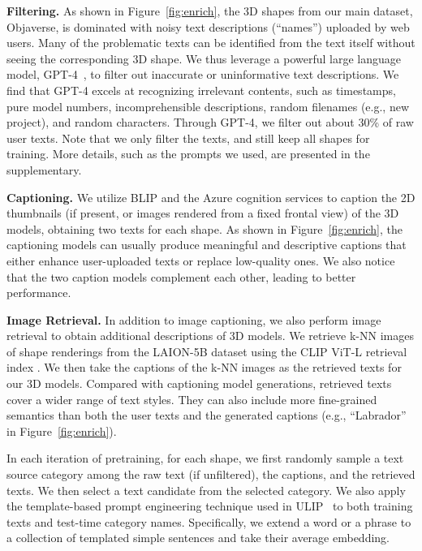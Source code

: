 \noindent \textbf{Filtering.}  As shown in Figure~\ref{fig:enrich}, the 3D shapes from our main dataset, Objaverse, is dominated with noisy text descriptions (``names'') uploaded by web users. Many of the problematic texts can be identified from the text itself without seeing the corresponding 3D shape. We thus leverage a powerful large language model, GPT-4~\cite{openai2023gpt4}, to filter out inaccurate or uninformative text descriptions. We find that GPT-4 excels at recognizing irrelevant contents, such as timestamps, pure model numbers, incomprehensible descriptions, random filenames (e.g., new project), and random characters. Through GPT-4, we filter out about 30\% of raw user texts. Note that we only filter the texts, and still keep all shapes for training. More details, such as the prompts we used, are presented in the supplementary.

\noindent \textbf{Captioning.}  We utilize BLIP \cite{li2022blip} and the Azure cognition services to caption the 2D thumbnails (if present, or images rendered from a fixed frontal view) of the 3D models, obtaining two texts for each shape. As shown in Figure~\ref{fig:enrich}, the captioning models can usually produce meaningful and descriptive captions that either enhance user-uploaded texts or replace low-quality ones. We also notice that the two caption models complement each other, leading to better performance. 

\noindent \textbf{Image Retrieval.}  In addition to image captioning, we also perform image retrieval to obtain additional descriptions of 3D models. We retrieve k-NN images of shape renderings from the LAION-5B dataset \cite{schuhmann2022laion} using the CLIP ViT-L retrieval index \cite{beaumont-2022-clip-retrieval}. We then take the captions of the k-NN images as the retrieved texts for our 3D models. Compared with captioning model generations, retrieved texts cover a wider range of text styles. They can also include more fine-grained semantics than both the user texts and the generated captions (e.g., ``Labrador'' in Figure~\ref{fig:enrich}).


In each iteration of pretraining, for each shape, we first randomly sample a text source category among the raw text (if unfiltered), the captions, and the retrieved texts. We then select a text candidate from the selected category. We also apply the template-based prompt engineering technique used in ULIP~\cite{xue2022ulip} to both training texts and test-time category names. Specifically, we extend a word or a phrase to a collection of templated simple sentences and take their average embedding. %

